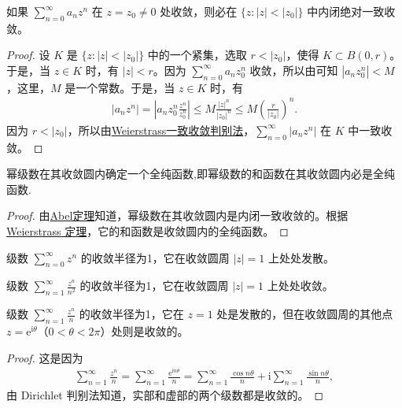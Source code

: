 \documentclass[../../main.tex]{subfiles}
\begin{document}
\begin{theorem}[Abel定理]\label{theorem:Abel定理-定理4.2.3}
如果 \( \sum_{n=0}^{\infty} a_n z^n \) 在 \( z = z_0 \neq 0 \) 处收敛，则必在 \( \{z : |z| < |z_0|\} \) 中内闭绝对一致收敛。
\end{theorem}
\begin{proof}
设 \( K \) 是 \( \{z : |z| < |z_0|\} \) 中的一个紧集，选取 \( r < |z_0| \)，使得 \( K \subset B(0, r) \)。于是，当 \( z \in K \) 时，有 \( |z| < r \)。因为 \( \sum_{n=0}^{\infty} a_n z_0^n \) 收敛，所以由可知 \( |a_n z_0^n| < M \)，这里，\( M \) 是一个常数。于是，当 \( z \in K \) 时，有
\begin{align*}
|a_n z^n| = \left| a_n z_0^n \frac{z^n}{z_0^n} \right| \leqslant M \frac{|z|^n}{|z_0|^n} \leqslant M \left( \frac{r}{|z_0|} \right)^n.
\end{align*}
因为 \( r < |z_0| \)，所以由\hyperref[theorem:Weierstrass一致收敛判别法]{Weierstrass一致收敛判别法}，\( \sum_{n=0}^{\infty} |a_n z^n| \) 在 \( K \) 中一致收敛。

\end{proof}

\begin{theorem}\label{theorem:定理4.2.4}
幂级数在其收敛圆内确定一个全纯函数,即幂级数的和函数在其收敛圆内必是全纯函数.
\end{theorem}
\begin{proof}
由\hyperref[theorem:Abel定理-定理4.2.3]{Abel定理}知道，幂级数在其收敛圆内是内闭一致收敛的。根据 \hyperref[theorem:Weierstrass定理]{Weierstrass 定理}，它的和函数是收敛圆内的全纯函数。

\end{proof}

\begin{example}
级数 \( \sum_{n=0}^{\infty} z^n \) 的收敛半径为1，它在收敛圆周 \( |z| = 1 \) 上处处发散。
\end{example}

\begin{example}
级数 \( \sum_{n=1}^{\infty} \frac{z^n}{n^2} \) 的收敛半径为1，它在收敛圆周 \( |z| = 1 \) 上处处收敛。
\end{example}

\begin{example}
级数 \( \sum_{n=1}^{\infty} \frac{z^n}{n} \) 的收敛半径为1，它在 \( z = 1 \) 处是发散的，但在收敛圆周的其他点 \( z = \mathrm{e}^{\mathrm{i}\theta} \)（\( 0 < \theta < 2\pi \)）处则是收敛的。
\end{example}
\begin{proof}
这是因为
\begin{align*}
\sum_{n=1}^{\infty} \frac{z^n}{n} = \sum_{n=1}^{\infty} \frac{\mathrm{e}^{\mathrm{i}n\theta}}{n} = \sum_{n=1}^{\infty} \frac{\cos n\theta}{n} + \mathrm{i}\sum_{n=1}^{\infty} \frac{\sin n\theta}{n},
\end{align*}
由 Dirichlet 判别法知道，实部和虚部的两个级数都是收敛的。

\end{proof}
\end{document}
